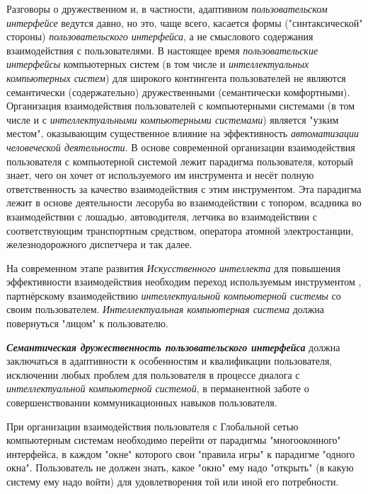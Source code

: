 Разговоры о дружественном и, в частности, адаптивном \textit{пользовательском интерфейсе} ведутся давно, но это, чаще всего, касается формы ("синтаксической" стороны) \textit{пользовательского интерфейса}, а не смыслового содержания взаимодействия с пользователями. В настоящее время \textit{пользовательские интерфейсы} компьютерных систем (в том числе и \textit{интеллектуальных компьютерных систем}) для широкого контингента пользователей не являются семантически (содержательно) дружественными (семантически комфортными). Организация взаимодействия пользователей с компьютерными системами (в том числе и с \textit{интеллектуальными компьютерными системами}) является "узким местом"{}, оказывающим существенное влияние на эффективность \textit{автоматизации человеческой деятельности}. В основе современной организации взаимодействия пользователя с компьютерной системой лежит парадигма  пользователя, который знает, чего он хочет от используемого им инструмента и несёт полную ответственность за качество взаимодействия с этим инструментом. Эта парадигма лежит в основе деятельности лесоруба во взаимодействии с топором, всадника во взаимодействии с лошадью, автоводителя, летчика во взаимодействии с соответствующим транспортным средством, оператора атомной электростанции, железнодорожного диспетчера и так далее.

На современном этапе развития \textit{Искусственного интеллекта} для повышения эффективности взаимодействия необходим переход    используемым инструментом   , партнёрскому взаимодействию \textit{интеллектуальной компьютерной системы} со своим пользователем. \textit{Интеллектуальная компьютерная система} должна повернуться "лицом"{} к пользователю.

\textbf{\textit{Семантическая дружественность пользовательского интерфейса}} должна заключаться в адаптивности к особенностям и квалификации пользователя, исключении любых проблем для пользователя в процессе диалога с \textit{интеллектуальной компьютерной системой}, в перманентной заботе о совершенствовании коммуникационных навыков пользователя.

При организации взаимодействия пользователя с Глобальной сетью компьютерным системам необходимо перейти от парадигмы "многооконного"{} интерфейса, в каждом "окне"{} которого свои "правила игры"{} к парадигме "одного окна"{}. Пользователь не должен знать, какое "окно"{} ему надо "открыть"{} (в какую систему ему надо войти) для удовлетворения той или иной его потребности.

